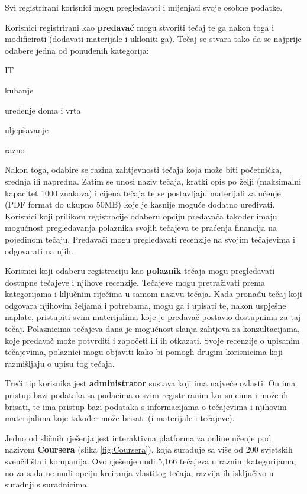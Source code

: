 	Svi registrirani korisnici mogu pregledavati i mijenjati svoje osobne podatke.
	
	Korisnici registrirani kao \textbf{predavač} mogu stvoriti tečaj te ga nakon toga i modificirati (dodavati materijale i ukloniti ga). Tečaj se stvara tako da se najprije odabere jedna od ponuđenih kategorija:
	\begin{packed_item}
		\item IT
		\item kuhanje
		\item uređenje doma i vrta
		\item uljepšavanje
		\item razno
	\end{packed_item}
 Nakon toga, odabire se razina zahtjevnosti tečaja koja može biti početnička, srednja ili napredna. Zatim se unosi naziv tečaja, kratki opis po želji (maksimalni kapacitet 1000 znakova) i cijena tečaja te se postavljaju materijali za učenje (PDF format do ukupno 50MB) koje je kasnije moguće dodatno uređivati. Korisnici koji prilikom registracije odaberu opciju predavača također imaju mogućnost pregledavanja polaznika svojih tečajeva te praćenja financija na pojedinom tečaju. Predavači mogu pregledavati recenzije na svojim tečajevima i odgovarati na njih.
	
	Korisnici koji odaberu registraciju kao \textbf{polaznik} tečaja mogu pregledavati dostupne tečajeve i njihove recenzije. Tečajeve mogu pretraživati prema kategorijama i ključnim riječima u samom nazivu tečaja. Kada pronađu tečaj koji odgovara njihovim željama i potrebama, mogu ga i upisati te, nakon uspješne naplate, pristupiti svim materijalima koje je predavač postavio dostupnima za taj tečaj. Polaznicima tečajeva dana je mogućnost slanja zahtjeva za konzultacijama, koje predavač može potvrditi i započeti ili ih otkazati. Svoje recenzije o upisanim tečajevima, polaznici mogu objaviti kako bi pomogli drugim korisnicima koji razmišljaju o upisu tog tečaja.
	
	Treći tip korisnika jest \textbf{administrator} sustava koji ima najveće ovlasti. On ima pristup bazi podataka sa podacima o svim registriranim korisnicima i može ih brisati, te ima pristup bazi podataka s informacijama o tečajevima i njihovim materijalima koje također može brisati (i materijale i tečajeve).
	
	Jedno od sličnih rješenja jest interaktivna platforma za online učenje pod nazivom \textbf{Coursera} (slika \ref{fig:Coursera}), koja surađuje sa više od 200 svjetskih sveučilišta i kompanija. Ovo rješenje nudi 5,166 tečajeva u raznim kategorijama, no za sada ne nudi opciju kreiranja vlastitog tečaja, razvija ih isključivo u suradnji s suradnicima.
	
